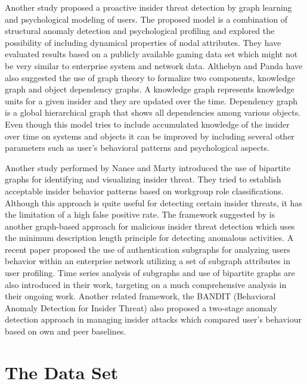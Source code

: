 \documentclass[conference,draftclsnofoot,onecolumn]{IEEEtran}%
\begin{document}
Another study \cite{Brdiczka2012} proposed a proactive insider threat detection by graph learning and psychological modeling of users. The proposed model is a combination of structural anomaly detection and psychological profiling and explored the possibility of including dynamical properties of nodal attributes. They have evaluated results based on a publicly available gaming data set which might not be very similar to enterprise system and network data. Althebyn and Panda \cite{Althebyan2007} have also suggested the use of graph theory to formalize two components, knowledge graph and object dependency graphs. A knowledge graph represents knowledge units for a given insider and they are updated over the time. Dependency graph is a global hierarchical graph that shows all dependencies among various objects. Even though this model tries to include accumulated knowledge of the insider over time on systems and objects it can be improved by including several other parameters such as user's behavioral patterns and psychological aspects.

Another study performed by Nance and Marty \cite{Nance2011} introduced the use of bipartite graphs for identifying and visualizing insider threat. They tried to establish acceptable insider behavior patterns based on workgroup role classifications. Although this approach is quite useful for detecting certain insider threats, it has the limitation of a high false positive rate. The framework suggested by \cite{Eberle2009} is another graph-based approach for malicious insider threat detection which uses the minimum description length principle for detecting anomalous activities.
A recent paper \cite{Kent2015} proposed the use of authentication subgraphs for analyzing users behavior within an enterprise network utilizing a set of subgraph attributes in user profiling. Time series analysis of subgraphs and use of bipartite graphs are also introduced in their work, targeting on a much comprehensive analysis in their ongoing work. Another related framework, the BANDIT (Behavioral Anomaly Detection for Insider Threat) \cite{Berk} also proposed a two-stage anomaly detection approach in managing insider attacks which compared user's behaviour based on own and peer baselines.   

\section{The Data Set}
\end{document}
